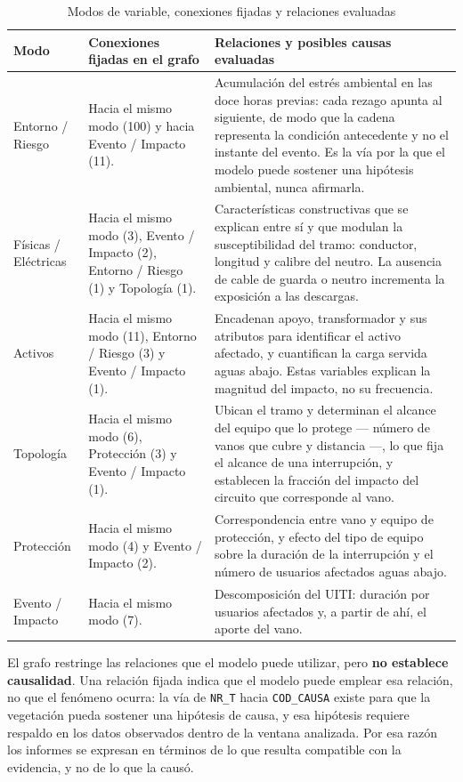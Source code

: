 \documentclass[11pt,a4paper]{article}
\begin{document}
\begin{table}[H]
\centering
\caption{Modos de variable, conexiones fijadas y relaciones evaluadas}
\label{tab:modos}
\footnotesize
\begin{tabularx}{\textwidth}{L{2.4cm} L{4.6cm} X}
\toprule
\textbf{Modo} & \textbf{Conexiones fijadas en el grafo} & \textbf{Relaciones y posibles causas evaluadas} \\
\midrule
Entorno / Riesgo &
Hacia el mismo modo (100) y hacia Evento / Impacto (11). &
Acumulación del estrés ambiental en las doce horas previas: cada rezago apunta al siguiente,
de modo que la cadena representa la condición antecedente y no el instante del evento. Es la
vía por la que el modelo puede sostener una hipótesis ambiental, nunca afirmarla. \\
\addlinespace
Físicas / Eléctricas &
Hacia el mismo modo (3), Evento / Impacto (2), Entorno / Riesgo (1) y Topología (1). &
Características constructivas que se explican entre sí y que modulan la susceptibilidad del
tramo: conductor, longitud y calibre del neutro. La ausencia de cable de guarda o neutro
incrementa la exposición a las descargas. \\
\addlinespace
Activos &
Hacia el mismo modo (11), Entorno / Riesgo (3) y Evento / Impacto (1). &
Encadenan apoyo, transformador y sus atributos para identificar el activo afectado, y
cuantifican la carga servida aguas abajo. Estas variables explican la magnitud del impacto, no
su frecuencia. \\
\addlinespace
Topología &
Hacia el mismo modo (6), Protección (3) y Evento / Impacto (1). &
Ubican el tramo y determinan el alcance del equipo que lo protege --- número de vanos que cubre
y distancia ---, lo que fija el alcance de una interrupción, y establecen la fracción del
impacto del circuito que corresponde al vano. \\
\addlinespace
Protección &
Hacia el mismo modo (4) y Evento / Impacto (2). &
Correspondencia entre vano y equipo de protección, y efecto del tipo de equipo sobre la
duración de la interrupción y el número de usuarios afectados aguas abajo. \\
\addlinespace
Evento / Impacto &
Hacia el mismo modo (7). &
Descomposición del UITI: duración por usuarios afectados y, a partir de ahí, el aporte del
vano. \\
\bottomrule
\end{tabularx}
\end{table}

El grafo restringe las relaciones que el modelo puede utilizar, pero \textbf{no establece
causalidad}. Una relación fijada indica que el modelo puede emplear esa relación, no que el
fenómeno ocurra: la vía de \texttt{NR\_T} hacia \texttt{COD\_CAUSA} existe para que la
vegetación pueda sostener una hipótesis de causa, y esa hipótesis requiere respaldo en los
datos observados dentro de la ventana analizada. Por esa razón los informes se expresan en
términos de lo que resulta compatible con la evidencia, y no de lo que la causó.
\end{document}
